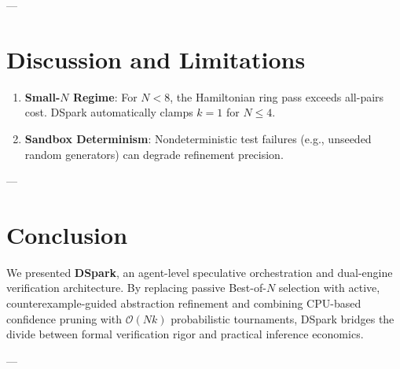 \documentclass[10pt,twocolumn,letterpaper]{article}
\begin{document}
---

\section{Discussion and Limitations}
\begin{enumerate}
    \item \textbf{Small-$N$ Regime}: For $N < 8$, the Hamiltonian ring pass exceeds all-pairs cost. DSpark automatically clamps $k=1$ for $N \le 4$.
    \item \textbf{Sandbox Determinism}: Nondeterministic test failures (e.g., unseeded random generators) can degrade refinement precision.
\end{enumerate}

---

\section{Conclusion}
We presented \textbf{DSpark}, an agent-level speculative orchestration and dual-engine verification architecture. By replacing passive Best-of-$N$ selection with active, counterexample-guided abstraction refinement and combining CPU-based confidence pruning with $\mathcal{O}(Nk)$ probabilistic tournaments, DSpark bridges the divide between formal verification rigor and practical inference economics.

---
\end{document}
